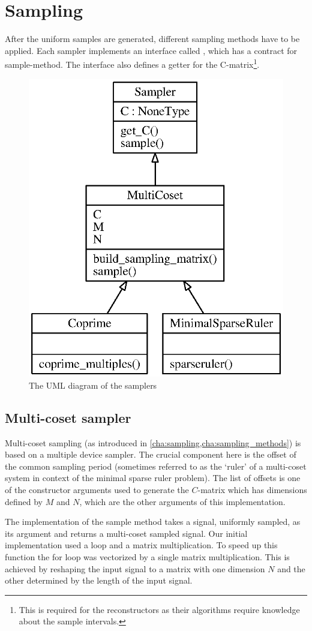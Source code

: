 \documentclass[a4paper, openany, oneside]{memoir}
\begin{document}
\section{Sampling}
\label{sec:sampling}
After the uniform samples are generated, different sampling methods have to be applied. Each sampler implements an interface called , which has a contract for sample-method. The interface also defines a getter for the C-matrix\footnote{This is required for the reconstructors as their algorithms require knowledge about the sample intervals.}.

\begin{figure}
    \centering
    \includegraphics[width=0.5\linewidth]{./figures/classes_sampling.eps}
    \caption{The UML diagram of the samplers}
    \label{fig:umlclasses}
\end{figure}

\subsection{Multi-coset sampler}
\label{sub:multi_coset_sampler}
Multi-coset sampling (as introduced in \cref{cha:sampling,cha:sampling_methods}) is based on a multiple device sampler. The crucial component here is the offset of the common sampling period (sometimes referred to as the `ruler' of a multi-coset system in context of the minimal sparse ruler problem). The list of offsets is one of the constructor arguments used to generate the $C$-matrix which has dimensions defined by $M$ and $N$, which are the other arguments of this implementation.

The implementation of the sample method takes a signal, uniformly sampled, as its argument and returns a multi-coset sampled signal. Our initial implementation used a loop and a matrix multiplication. To speed up this function the for loop was vectorized by a single matrix multiplication. This is achieved by reshaping the input signal to a matrix with one dimension $N$ and the other determined by the length of the input signal.
\end{document}
